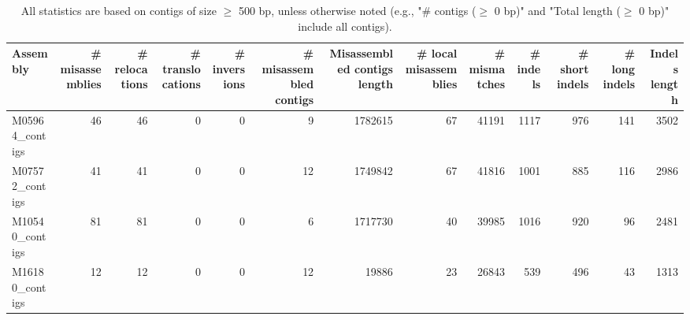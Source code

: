 \documentclass[12pt,a4paper]{article}
\begin{document}
\begin{table}[ht]
\begin{center}
\caption{All statistics are based on contigs of size $\geq$ 500 bp, unless otherwise noted (e.g., "\# contigs ($\geq$ 0 bp)" and "Total length ($\geq$ 0 bp)" include all contigs).}
\begin{tabular}{|l*{12}{|r}|}
\hline
Assembly & \# misassemblies &     \# relocations &     \# translocations &     \# inversions & \# misassembled contigs & Misassembled contigs length & \# local misassemblies & \# mismatches & \# indels &     \# short indels &     \# long indels & Indels length \\ \hline
M05964\_contigs & 46 & 46 & 0 & 0 & 9 & 1782615 & 67 & 41191 & 1117 & 976 & 141 & 3502 \\ \hline
M07572\_contigs & 41 & 41 & 0 & 0 & 12 & 1749842 & 67 & 41816 & 1001 & 885 & 116 & 2986 \\ \hline
M10540\_contigs & 81 & 81 & 0 & 0 & 6 & 1717730 & 40 & 39985 & 1016 & 920 & 96 & 2481 \\ \hline
M16180\_contigs & 12 & 12 & 0 & 0 & 12 & 19886 & 23 & 26843 & 539 & 496 & 43 & 1313 \\ \hline
\end{tabular}
\end{center}
\end{table}
\end{document}
